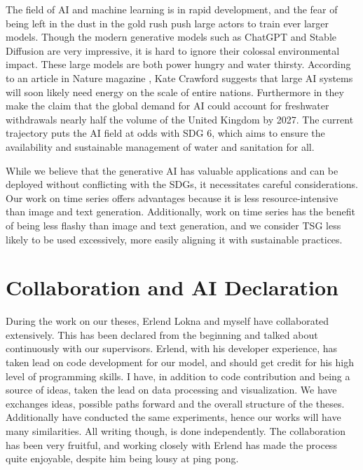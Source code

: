 \documentclass[../../thesis.tex]{subfiles}
\begin{document}
The field of AI and machine learning is in rapid development, and the fear of being left in the dust in the gold rush push large actors to train ever larger models. Though the modern generative models such as ChatGPT and Stable Diffusion are very impressive, it is hard to ignore their colossal environmental impact. These large models are both power hungry and water thirsty. According to an article in Nature magazine \cite{AI_energy}, Kate Crawford suggests that large AI systems will soon likely need energy on the scale of entire nations. Furthermore in \cite{li2023making} they make the claim that the global demand for AI could account for freshwater withdrawals nearly half the volume of the United Kingdom by 2027. The current trajectory puts the AI field at odds with SDG 6, which aims to ensure the availability and sustainable management of water and sanitation for all.\newline

While we believe that the generative AI has valuable applications and can be deployed without conflicting with the SDGs, it necessitates careful considerations. Our work on time series offers advantages because it is less resource-intensive than image and text generation. Additionally, work on time series has the benefit of being less flashy than image and text generation, and we consider TSG less likely to be used excessively, more easily aligning it with sustainable practices.

\section{Collaboration and AI Declaration}

During the work on our theses, Erlend Lokna and myself have collaborated extensively. This has been declared from the beginning and talked about continuously with our supervisors. Erlend, with his developer experience, has taken lead on code development for our model, and should get credit for his high level of programming skills. I have, in addition to code contribution and being a source of ideas, taken the lead on data processing and visualization. We have exchanges ideas, possible paths forward and the overall structure of the theses. Additionally have conducted the same experiments, hence our works will have many similarities. All writing though, is done independently. The collaboration has been very fruitful, and working closely with Erlend has made the process quite enjoyable, despite him being lousy at ping pong. \newline
\end{document}
